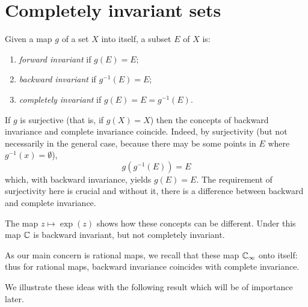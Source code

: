 \section{Completely invariant sets}
\label{sec:completely_invariant_sets}

\begin{definition}
    Given a map $g$ of a set $X$ into itself, a subset $E$ of $X$ is:
    \begin{enumerate}[label=(\alph*)]
        \item \emph{forward invariant} if $g(E) = E$;
        \item \emph{backward invariant} if $g^{-1}(E) = E$;
        \item \emph{completely invariant} if $g(E) = E = g^{-1}(E)$.
    \end{enumerate}
\end{definition}

\begin{remark}[$g$ surjective $\implies$ backward invariant $=$ completely invariant]
    If $g$ is surjective (that is, if $g(X) = X$) then the concepts of backward
    invariance and complete invariance coincide. Indeed, by surjectivity (but
    not necessarily in the general case, because there may be some points in $E$
    where $g^{-1}(x) = \emptyset$),
    \begin{equation*}
        g(g^{-1}(E)) = E
    \end{equation*}
    which, with backward invariance, yields $g(E) = E$. The requirement of
    surjectivity here is crucial and without it, there is a difference between
    backward and complete invariance.
\end{remark}

\begin{example}
    The map $z \mapsto \exp(z)$ shows how these concepts can be different. Under
    this map $\mathbb{C}$ is backward invariant, but not completely invariant.
\end{example}

As our main concern is rational maps, we recall that these map $\mathbb{C}_\infty$ onto
itself: thus for rational maps, backward invariance coincides with complete
invariance.

We illustrate these ideas with the following result which will be of importance
later.

